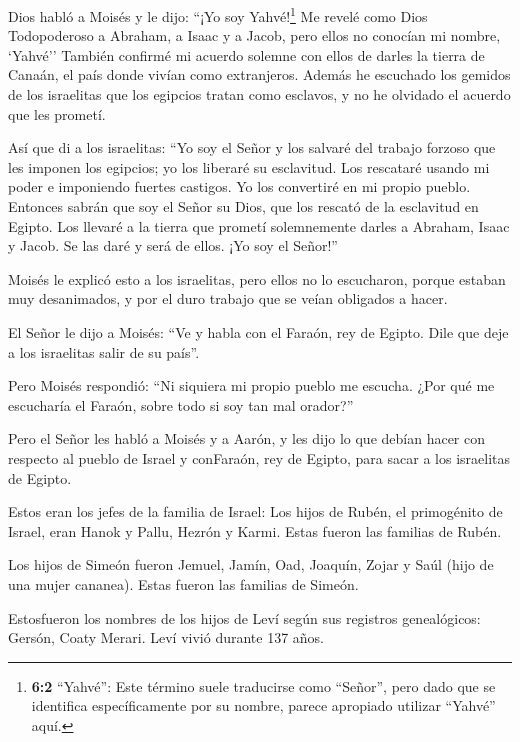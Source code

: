  Dios habló a Moisés y le dijo: ``¡Yo soy Yahvé!\footnote{\textbf{6:2}
  ``Yahvé'': Este término suele traducirse como ``Señor'', pero dado que
  se identifica específicamente por su nombre, parece apropiado utilizar
  ``Yahvé'' aquí.}  Me revelé como Dios Todopoderoso a
Abraham, a Isaac y a Jacob, pero ellos no conocían mi nombre, `Yahvé''
 También confirmé mi acuerdo solemne con ellos de darles la
tierra de Canaán, el país donde vivían como extranjeros. 
Además he escuchado los gemidos de los israelitas que los egipcios
tratan como esclavos, y no he olvidado el acuerdo que les prometí.

 Así que di a los israelitas: ``Yo soy el Señor y los
salvaré del trabajo forzoso que les imponen los egipcios; yo los
liberaré su esclavitud. Los rescataré usando mi poder e imponiendo
fuertes castigos.  Yo los convertiré en mi propio pueblo.
Entonces sabrán que soy el Señor su Dios, que los rescató de la
esclavitud en Egipto.  Los llevaré a la tierra que prometí
solemnemente darles a Abraham, Isaac y Jacob. Se las daré y será de
ellos. ¡Yo soy el Señor!''

 Moisés le explicó esto a los israelitas, pero ellos no lo
escucharon, porque estaban muy desanimados, y por el duro trabajo que se
veían obligados a hacer.

 El Señor le dijo a Moisés:  ``Ve y habla con
el Faraón, rey de Egipto. Dile que deje a los israelitas salir de su
país''.

 Pero Moisés respondió: ``Ni siquiera mi propio pueblo me
escucha. ¿Por qué me escucharía el Faraón, sobre todo si soy tan mal
orador?''

 Pero el Señor les habló a Moisés y a Aarón, y les dijo lo
que debían hacer con respecto al pueblo de Israel y conFaraón, rey de
Egipto, para sacar a los israelitas de Egipto.

 Estos eran los jefes de la familia de Israel: Los hijos de
Rubén, el primogénito de Israel, eran Hanok y Pallu, Hezrón y Karmi.
Estas fueron las familias de Rubén.

 Los hijos de Simeón fueron Jemuel, Jamín, Oad, Joaquín,
Zojar y Saúl (hijo de una mujer cananea). Estas fueron las familias de
Simeón.

 Estosfueron los nombres de los hijos de Leví según sus
registros genealógicos: Gersón, Coaty Merari. Leví vivió durante 137
años.


